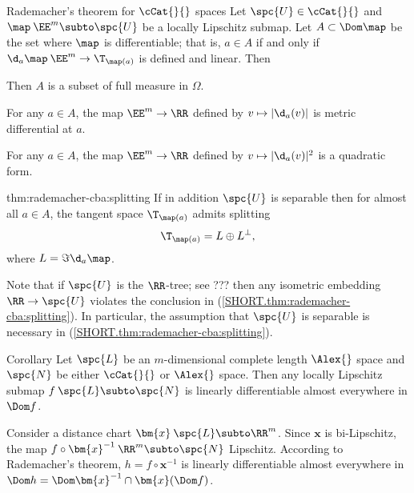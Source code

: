\begin{thm}{Rademacher's theorem for $\cCat{}{}$ spaces}\label{thm:rademacher-cba}
Let $\spc{U}\in\cCat{}{}$  
and $\map\:\EE^m\subto\spc{U}$ be a locally Lipschitz submap.
Let $A\subset \Dom \map$ be the set where $\map$ is differentiable;
that is, $a\in A$ if and only if $\d_a\map\:\EE^m\to\T_{\map(a)}$ is defined and linear.
Then 
\begin{subthm}{}
Then $A$ is a subset of full measure in $\Omega$.
\end{subthm}

\begin{subthm}{}
For any $a\in A$,
the map $\EE^m\to\RR$ defined by $v\mapsto |\d_a(v)|$ is metric differential at $a$.
\end{subthm}

\begin{subthm}{}
For any $a\in A$,
the map $\EE^m\to\RR$ defined by $v\mapsto |\d_a(v)|^2$ is a quadratic form.
\end{subthm}

\begin{subthm}{thm:rademacher-cba:splitting}
If in addition $\spc{U}$ is separable then for almost all $a\in A$, 
the tangent space
$\T_{\map(a)}$ admits splitting
\[\T_{\map(a)}=L\oplus L^\bot,\]
where $L=\Im\d_a\map$.
\end{subthm}
\end{thm}

Note that if $\spc{U}$ is the $\RR$-tree;
see ??? then any isometric embedding $\RR\to \spc{U}$ violates the conclusion in (\ref{SHORT.thm:rademacher-cba:splitting}).
In particular, the assumption that $\spc{U}$ is separable is necessary in (\ref{SHORT.thm:rademacher-cba:splitting}).


\begin{thm}{Corollary}\label{cor:rademacher-cbb-sourse}
Let $\spc{L}$ be an $m$-dimensional complete length $\Alex{}$ space and $\spc{N}$ be either $\cCat{}{}$ or $\Alex{}$ space.
Then any locally Lipschitz submap $f\:\spc{L}\subto\spc{N}$ is linearly differentiable almost everywhere in $\Dom f$. 
\end{thm}

Consider a distance chart $\bm{x}\:\spc{L}\subto \RR^m$.
Since $\bm{x}$ is bi-Lipschitz,
the map $f\circ\bm{x}^{-1}\:\RR^m\subto\spc{N}$ Lipschitz.
According to Rademacher's theorem,
$h=f\circ\bm{x}^{-1}$ is linearly differentiable almost everywhere
in $\Dom h=\Dom\bm{x}^{-1}\cap \bm{x}(\Dom f)$.

